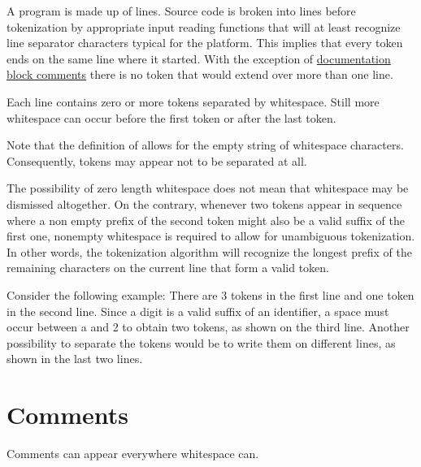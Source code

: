 A program is made up of lines.
Source code is broken into lines before tokenization by appropriate
input reading functions that will at least recognize line separator
characters typical for the platform. This implies that every token
ends on the same line where it started. 
With the exception of \hyperref[doccomment]{documentation block comments} there is no token that would
extend over more than one line.

Each line contains zero or more tokens separated by whitespace. Still
more whitespace can occur before the first token or after the last
token.

Note that the definition of  allows for the empty
string of whitespace characters. Consequently, tokens may appear not to
be separated at all.

The possibility of zero length whitespace does not mean that whitespace
may be dismissed altogether. On the contrary, whenever two tokens appear
in sequence where a non empty prefix of the second token might also be a
valid suffix of the first one, nonempty whitespace is required to allow
for unambiguous tokenization. In other words, the tokenization algorithm
will recognize the longest prefix of the remaining characters on the
current line that form a valid token.

Consider the following example:
There are 3 tokens in the first line and one token in the second line.
Since a digit is a valid suffix of an identifier, a space must occur
between a and 2 to obtain two tokens, as shown on the third line.
Another possibility to separate the tokens would be to write them on
different lines, as shown in the last two lines.

\section{Comments} 

Comments can appear everywhere whitespace can.

\begin{flushleft}
  \oder{} \\
  \\
 \regex{/$\backslash$*}\regex{$\backslash$*/}\\
  
\end{flushleft}

